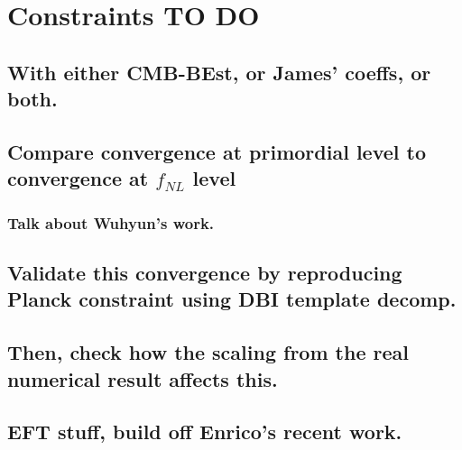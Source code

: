 %
\chapter{Constraints TO DO}
\section{With either CMB-BEst, or James' coeffs, or both.}
\section{Compare convergence at primordial level to convergence at $f_{NL}$ level}
    \subsection{Talk about Wuhyun's work.}
\section{Validate this convergence by reproducing Planck constraint using DBI template decomp.}
\section{Then, check how the scaling from the real numerical result affects this.}
\section{EFT stuff, build off Enrico's recent work.}
